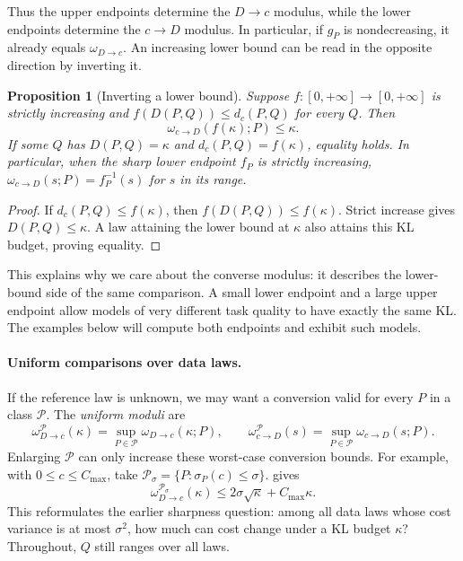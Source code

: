 \documentclass[11pt,twoside]{article}
\newcommand{\KL}{D}
\newtheorem{proposition}[theorem]{Proposition}
\theoremstyle{definition}
\theoremstyle{remark}
\begin{document}
Thus the upper endpoints determine the \(D\to c\) modulus, while the
lower endpoints determine the \(c\to D\) modulus. In particular, if
\(g_P\) is nondecreasing, it already equals \(\omega_{D\to c}\).
An increasing lower bound can be read in the opposite direction by
inverting it.

\begin{proposition}[Inverting a lower bound]
\label{prop:lower-bound-inversion}
Suppose \(f:[0,+\infty]\to[0,+\infty]\) is strictly increasing and
\(f(\KL(P, Q))\le d_c(P,Q)\) for every \(Q\). Then
\[
 \omega_{c\to D}(f(\kappa);P)\le\kappa.
\]
If some \(Q\) has \(\KL(P, Q)=\kappa\) and \(d_c(P,Q)=f(\kappa)\),
equality holds. In particular, when the sharp lower endpoint \(f_P\)
is strictly increasing,
\(\omega_{c\to D}(s;P)=f_P^{-1}(s)\) for \(s\) in its range.
\end{proposition}

\begin{proof}
If \(d_c(P,Q)\le f(\kappa)\), then
\(f(\KL(P, Q))\le f(\kappa)\). Strict increase gives
\(\KL(P, Q)\le\kappa\). A law attaining the lower bound at \(\kappa\)
also attains this KL budget, proving equality.
\end{proof}

This explains why we care about the converse modulus: it describes
the lower-bound side of the same comparison. A small lower endpoint
and a large upper endpoint allow models of very different task quality
to have exactly the same KL. The examples below will compute both
endpoints and exhibit such models.

\paragraph{Uniform comparisons over data laws.}
If the reference law is unknown, we may want a conversion valid for
every \(P\) in a class \(\mathcal P\). The \emph{uniform moduli} are
\[
 \omega^{\mathcal P}_{D\to c}(\kappa)
   =\sup_{P\in\mathcal P}\omega_{D\to c}(\kappa;P),
 \qquad
 \omega^{\mathcal P}_{c\to D}(s)
   =\sup_{P\in\mathcal P}\omega_{c\to D}(s;P).
\]
Enlarging \(\mathcal P\) can only increase these worst-case conversion
bounds. For example, with \(0\le c\le C_{\max}\), take
\(\mathcal P_\sigma=\{P:\sigma_P(c)\le\sigma\}\).
 gives
\[
 \omega^{\mathcal P_\sigma}_{D\to c}(\kappa)
 \le 2\sigma\sqrt\kappa+C_{\max}\kappa.
\]
This reformulates the earlier sharpness question: among all data laws
whose cost variance is at most \(\sigma^2\), how much can cost change
under a KL budget \(\kappa\)? Throughout, \(Q\) still ranges over all laws.
\end{document}
